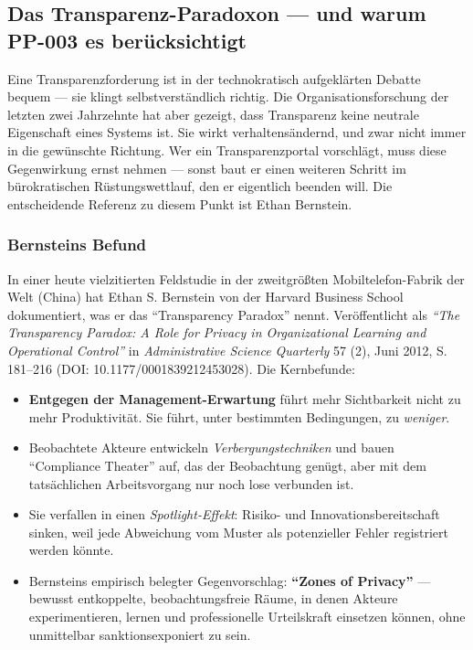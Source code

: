 \documentclass{umbruch-position}
\begin{document}
\subsection{Das Transparenz-Paradoxon --- und warum PP-003 es berücksichtigt}

Eine Transparenzforderung ist in der technokratisch aufgeklärten Debatte bequem --- sie klingt selbstverständlich richtig. Die Organisationsforschung der letzten zwei Jahrzehnte hat aber gezeigt, dass Transparenz keine neutrale Eigenschaft eines Systems ist. Sie wirkt verhaltensändernd, und zwar nicht immer in die gewünschte Richtung. Wer ein Transparenzportal vorschlägt, muss diese Gegenwirkung ernst nehmen --- sonst baut er einen weiteren Schritt im bürokratischen Rüstungswettlauf, den er eigentlich beenden will. Die entscheidende Referenz zu diesem Punkt ist Ethan Bernstein.

\subsubsection{Bernsteins Befund}

In einer heute vielzitierten Feldstudie in der zweitgrößten Mobiltelefon-Fabrik der Welt (China) hat Ethan S. Bernstein von der Harvard Business School dokumentiert, was er das ``Transparency Paradox'' nennt. Veröffentlicht als \textit{``The Transparency Paradox: A Role for Privacy in Organizational Learning and Operational Control''} in \textit{Administrative Science Quarterly} 57 (2), Juni 2012, S. 181--216 (DOI: 10.1177/0001839212453028). Die Kernbefunde:

\begin{itemize}[nosep]
  \item \textbf{Entgegen der Management-Erwartung} führt mehr Sichtbarkeit nicht zu mehr Produktivität. Sie führt, unter bestimmten Bedingungen, zu \textit{weniger}.
  \item Beobachtete Akteure entwickeln \textit{Verbergungstechniken} und bauen ``Compliance Theater'' auf, das der Beobachtung genügt, aber mit dem tatsächlichen Arbeitsvorgang nur noch lose verbunden ist.
  \item Sie verfallen in einen \textit{Spotlight-Effekt}: Risiko- und Innovationsbereitschaft sinken, weil jede Abweichung vom Muster als potenzieller Fehler registriert werden könnte.
  \item Bernsteins empirisch belegter Gegenvorschlag: \textbf{``Zones of Privacy''} --- bewusst entkoppelte, beobachtungsfreie Räume, in denen Akteure experimentieren, lernen und professionelle Urteilskraft einsetzen können, ohne unmittelbar sanktionsexponiert zu sein.
\end{itemize}
\end{document}
